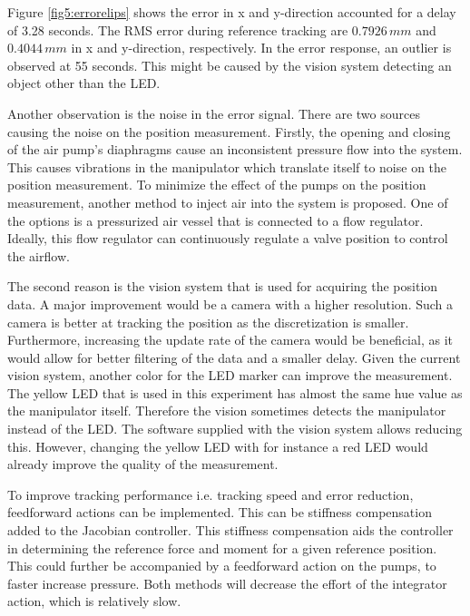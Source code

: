 Figure \ref{fig5:errorelips} shows the error in x and y-direction accounted for a delay of 3.28 seconds. The RMS error during reference tracking are $0.7926 \hspace{2pt} mm$ and $0.4044  \hspace{2pt} mm$ in x and y-direction, respectively. In the error response, an outlier is observed at 55 seconds. This might be caused by the vision system detecting an object other than the LED. 

Another observation is the noise in the error signal. There are two sources causing the noise on the position measurement. Firstly, the opening and closing of the air pump's diaphragms cause an inconsistent pressure flow into the system. This causes vibrations in the manipulator which translate itself to noise on the position measurement. To minimize the effect of the pumps on the position measurement, another method to inject air into the system is proposed. One of the options is a pressurized air vessel that is connected to a flow regulator. Ideally, this flow regulator can continuously regulate a valve position to control the airflow. 

The second reason is the vision system that is used for acquiring the position data. A major improvement would be a camera with a higher resolution. Such a camera is better at tracking the position as the discretization is smaller. Furthermore, increasing the update rate of the camera would be beneficial, as it would allow for better filtering of the data and a smaller delay. Given the current vision system, another color for the LED marker can improve the measurement. The yellow LED that is used in this experiment has almost the same hue value as the manipulator itself. Therefore the vision sometimes detects the manipulator instead of the LED. The software supplied with the vision system allows reducing this. However, changing the yellow LED with for instance a red LED would already improve the quality of the measurement.  

To improve tracking performance i.e. tracking speed and error reduction, feedforward actions can be implemented. This can be stiffness compensation added to the Jacobian controller. This stiffness compensation aids the controller in determining the reference force and moment for a given reference position. This could further be accompanied by a feedforward action on the pumps, to faster increase pressure. Both methods will decrease the effort of the integrator action, which is relatively slow. 


